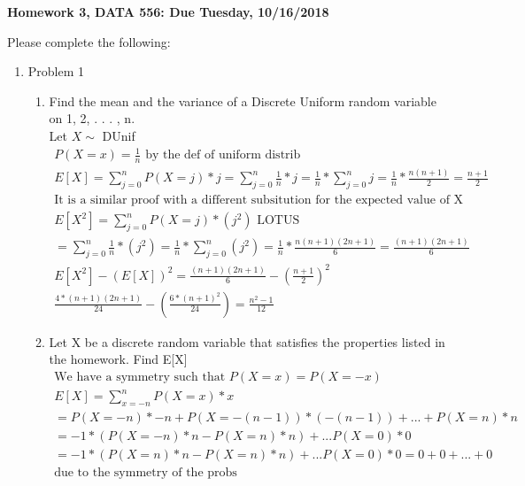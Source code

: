\documentclass[11pt]{article}
\begin{document}
\begin{title}
	{\Large\bf Homework 3, DATA 556: Due Tuesday, 10/16/2018}
\end{title}

\author{\bf Alexander Van Roijen}

\maketitle

\newpage
Please complete the following:
\begin{enumerate}
\item Problem 1
\begin{enumerate}
	\item Find the mean and the variance of a Discrete Uniform random variable on 1, 2, . . . , n.\\
	Let $X \sim $ DUnif
	\begin{gather}
	P(X = x) = \frac{1}{n} \text{ by the def of uniform distrib}\\
	E[X] = \sum_{j=0}^{n} P(X=j)*j = \sum_{j=0}^{n} \frac{1}{n}*j = \frac{1}{n} *\sum_{j=0}^{n} j = \frac{1}{n} * \frac{n(n+1)}{2} = \frac{n+1}{2}\\
	\text{It is a similar proof with a different subsitution for the expected value of X squared} \\
	E[X^2] = \sum_{j=0}^{n} P(X=j)*(j^2) \text{ LOTUS} \\
	= \sum_{j=0}^{n} \frac{1}{n}*(j^2) = \frac{1}{n} *\sum_{j=0}^{n} (j^2) = \frac{1}{n} * \frac{n(n+1)(2n+1)}{6} = \frac{(n+1)(2n+1)}{6}\\
	E[X^2]-(E[X])^2 = \frac{(n+1)(2n+1)}{6} - (\frac{n+1}{2})^2\\
	\frac{4*(n+1)(2n+1)}{24} - (\frac{6*(n+1)^2}{24}) = \frac{n^2-1}{12}
	\end{gather}
	\item Let X be a discrete random variable that satisfies the properties listed in the homework. Find E[X]
	\begin{gather}
		\text{We have a symmetry such that } P(X=x)=P(X=-x)\\
		E[X]= \sum_{x=-n}^{n} P(X=x)*x\\
		= P(X=-n)*-n + P(X=-(n-1))*(-(n-1)) + ... + P(X=n)*n \\
		= -1*(P(X=-n)*n - P(X=n)*n) + ... P(X=0)*0 \\
		=  -1*(P(X=n)*n - P(X=n)*n) + ... P(X=0)*0 = 0+0+...+0 \\
		\text{due to the symmetry of the probs}\\

\end{gather}
\end{enumerate}
\end{enumerate}
\end{document}
